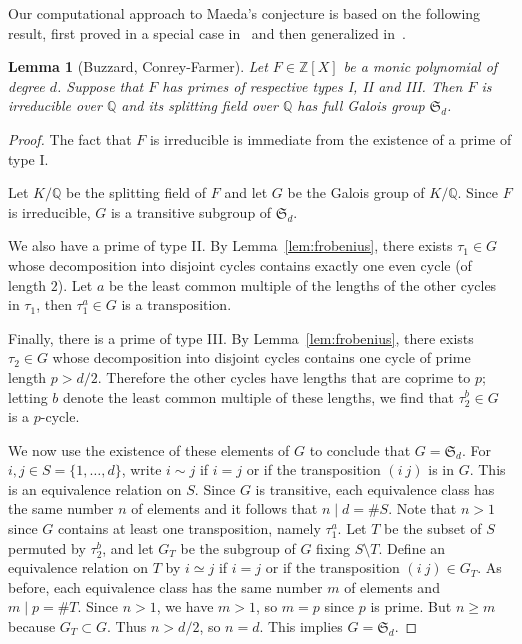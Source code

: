 \documentclass[11pt]{article}
\theoremstyle{plain}
\newtheorem{lemma}[theorem]{Lemma}
\theoremstyle{definition}
\theoremstyle{remark}
\numberwithin{equation}{section}
\newcommand{\ZZ}{\mathbb{Z}}
\newcommand{\QQ}{\mathbb{Q}}
\renewcommand{\SS}{\mathfrak{S}}
\begin{document}
Our computational approach to Maeda's conjecture is based on the following
result, first proved in a special case in~\cite{Buzzard} and then generalized
in~\cite{ConreyFarmer}.

\begin{lemma}[Buzzard, Conrey-Farmer]
  Let $F\in\ZZ[X]$ be a monic polynomial of degree $d$.  Suppose that $F$ has
  primes of respective types I, II and III.  Then $F$
  is irreducible over $\QQ$ and its splitting field over $\QQ$ has full Galois
  group $\SS_d$.
\end{lemma}
\begin{proof}
  The fact that $F$ is irreducible is immediate from the existence of a prime of type
  I. 

  Let $K/\QQ$ be the splitting field of $F$ and let $G$ be the Galois group of
  $K/\QQ$.  Since $F$ is irreducible, $G$ is a transitive subgroup of $\SS_d$. 

  We also have a prime of type II.
  By Lemma~\ref{lem:frobenius}, there exists $\tau_1\in G$ whose decomposition
  into disjoint cycles contains exactly one even cycle (of length
  $2$).  Let $a$ be the least common multiple of the lengths of the other
  cycles in $\tau_1$, then $\tau_1^a\in G$ is a transposition.
  
  Finally, there is a prime of type III.  By Lemma~\ref{lem:frobenius}, there
  exists $\tau_2\in G$ whose decomposition into disjoint cycles contains one
  cycle of prime length $p>d/2$.  Therefore the other cycles have
  lengths that are coprime to $p$; letting $b$ denote the least common
  multiple of these lengths, we find that $\tau_2^b\in G$ is a $p$-cycle.

  We now use the existence of these elements of $G$ to conclude that
  $G=\SS_d$.  For $i,j\in S=\{1,\ldots,d\}$, write $i\sim j$ if $i=j$ or if
  the transposition $(i~j)$ is in $G$.  This is an equivalence relation on
  $S$.  Since $G$ is
  transitive, each equivalence class has the same number $n$ of elements 
  and it follows that $n\mid d=\#S$. Note that $n>1$ since $G$ contains at least one
  transposition, namely $\tau_1^a$. 
  Let $T$ be the subset of $S$ permuted by
  $\tau_2^b$, and let $G_T$ be the subgroup of $G$ fixing $S\setminus T$.
  Define an equivalence relation on $T$ by $i\simeq j$ if $i=j$ or if the transposition
  $(i~j) \in G_T$. As before, each equivalence class has the same number $m$ of elements
  and $m\mid p=\#T$. Since $n>1$, we have $m>1$, so $m=p$ since $p$ is prime.
  But $n\geq m$ because $G_T\subset G$. Thus $n>d/2$, so $n=d$. This implies $G=\SS_d$. 
\end{proof}
\end{document}
